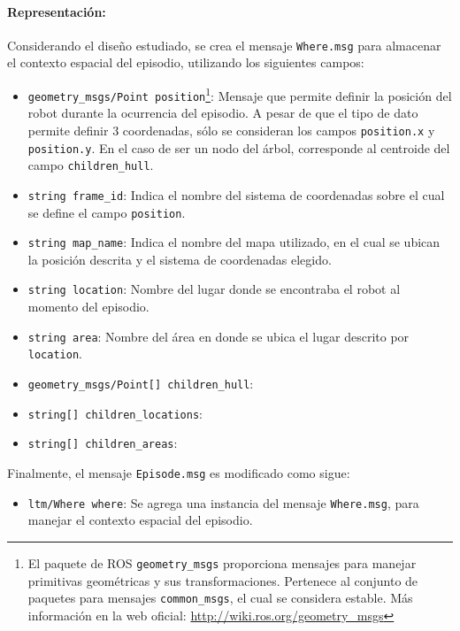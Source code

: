 \paragraph{Representación:}
Considerando el diseño estudiado, se crea el mensaje \texttt{Where.msg} para almacenar el contexto espacial del episodio, utilizando los siguientes campos:
\begin{itemize}
\item \texttt{geometry\_msgs/Point position}\footnote{El paquete de ROS \texttt{geometry\_msgs} proporciona mensajes para manejar primitivas geométricas y sus transformaciones. Pertenece al conjunto de paquetes para mensajes \texttt{common\_msgs}, el cual se considera estable. Más información en la web oficial: \url{http://wiki.ros.org/geometry\_msgs}}: Mensaje que permite definir la posición del robot durante la ocurrencia del episodio. A pesar de que el tipo de dato permite definir 3 coordenadas, sólo se consideran los campos \texttt{position.x} y \texttt{position.y}. En el caso de ser un nodo del árbol, corresponde al centroide del campo \texttt{children\_hull}.
\item \texttt{string frame\_id}: Indica el nombre del sistema de coordenadas sobre el cual se define el campo \texttt{position}.
\item \texttt{string map\_name}: Indica el nombre del mapa utilizado, en el cual se ubican la posición descrita y el sistema de coordenadas elegido. 
\item \texttt{string location}: Nombre del lugar donde se encontraba el robot al momento del episodio.
\item \texttt{string area}: Nombre del área en donde se ubica el lugar descrito por \texttt{location}. 
\item \texttt{geometry\_msgs/Point[] children\_hull}:
\item \texttt{string[] children\_locations}:
\item \texttt{string[] children\_areas}:
\end{itemize}


Finalmente, el mensaje \texttt{Episode.msg} es modificado como sigue:
\begin{itemize}
\item \texttt{ltm/Where where}: Se agrega una instancia del mensaje \texttt{Where.msg}, para manejar el contexto espacial del episodio.
\end{itemize}


